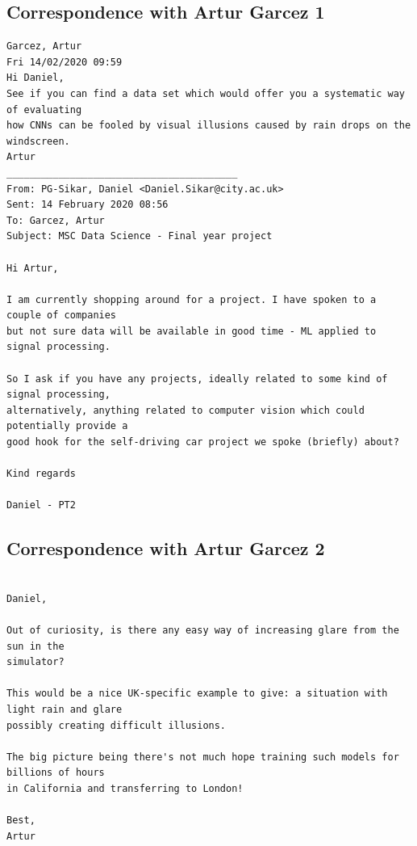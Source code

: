 \subsection{Correspondence with Artur Garcez 1}
\begin{verbatim}
Garcez, Artur
Fri 14/02/2020 09:59
Hi Daniel,
See if you can find a data set which would offer you a systematic way of evaluating
how CNNs can be fooled by visual illusions caused by rain drops on the windscreen.
Artur
________________________________________
From: PG-Sikar, Daniel <Daniel.Sikar@city.ac.uk>
Sent: 14 February 2020 08:56
To: Garcez, Artur
Subject: MSC Data Science - Final year project

Hi Artur,

I am currently shopping around for a project. I have spoken to a couple of companies
but not sure data will be available in good time - ML applied to signal processing.

So I ask if you have any projects, ideally related to some kind of signal processing,
alternatively, anything related to computer vision which could potentially provide a
good hook for the self-driving car project we spoke (briefly) about?

Kind regards

Daniel - PT2    
\end{verbatim}

\subsection{Correspondence with Artur Garcez 2}
\label{met:corr_arthur_2}
\begin{verbatim}

Daniel,

Out of curiosity, is there any easy way of increasing glare from the sun in the 
simulator?

This would be a nice UK-specific example to give: a situation with light rain and glare 
possibly creating difficult illusions.

The big picture being there's not much hope training such models for billions of hours 
in California and transferring to London!

Best,
Artur    
\end{verbatim}

